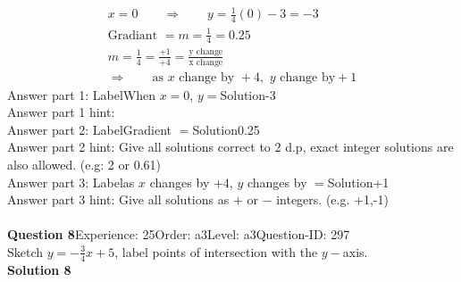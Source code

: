 \documentclass{article}
\begin{document}
\\[-35pt]\begin{align*}
&x=0\qquad\Rightarrow\qquad y=\displaystyle\frac{1}{4}(0)-3=-3&\\[2pt]
&\text{Gradiant}\,\,=m=\displaystyle\frac{1}{4}=0.25&\\[2pt]
&m=\displaystyle\frac{1}{4}=\displaystyle\frac{+1}{+4}=\displaystyle\frac{\text{y change}}{\text{x change}}&\\[2pt]
& \Rightarrow\qquad \text{as}\,\, x \,\,\text{change by } +4,\,\, y\,\, \text{change by} +1 &
\end{align*}
Answer part 1: \hspace{10pt}Label\hspace{10pt}When $x=0$, $y=$\hspace{10pt}Solution\hspace{10pt}-3\\
Answer part 1 hint: \hspace{15pt}\\
Answer part 2: \hspace{10pt}Label\hspace{10pt}Gradient $=$\hspace{10pt}Solution\hspace{10pt}0.25\\
Answer part 2 hint: \hspace{15pt}Give all solutions correct to 2 d.p, exact integer solutions are also allowed. (e.g: 2 or 0.61)\\
Answer part 3: \hspace{10pt}Label\hspace{10pt}as $x$ changes by $+4$, $y$ changes by $=$\hspace{10pt}Solution\hspace{10pt}+1\\
Answer part 3 hint: \hspace{15pt}Give all solutions as $+$ or $-$ integers. (e.g. +1,-1)\\
\\[4pt]
\noindent\textbf{Question 8}\hspace{20pt}Experience: 25\hspace{20pt}Order: a3\hspace{20pt}Level: a3\hspace{20pt}Question-ID: 297\\[2pt]
Sketch $y=-\displaystyle\frac{3}{4}x+5$, label points of intersection with the $y-$axis.\\[4pt]
\noindent\textbf{Solution 8}\\[2pt]
\end{document}
